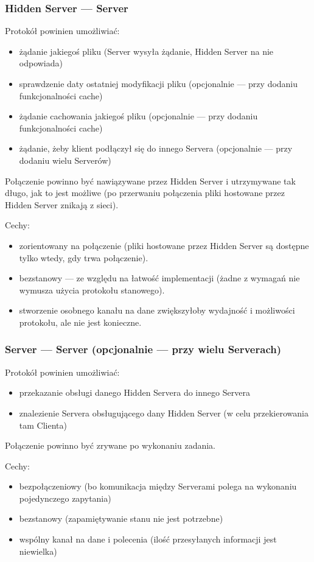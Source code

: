 \documentclass[a4paper,notitlepage]{article}
\begin{document}
\subsubsection{Hidden Server --- Server}
Protokół powinien umożliwiać:
\begin{itemize}
\item żądanie jakiegoś pliku (Server wysyła żądanie, Hidden Server na nie odpowiada)
\item sprawdzenie daty ostatniej modyfikacji pliku (opcjonalnie --- przy dodaniu funkcjonalności cache)
\item żądanie cachowania jakiegoś pliku (opcjonalnie --- przy dodaniu funkcjonalności cache)
\item żądanie, żeby klient podłączył się do innego Servera (opcjonalnie --- przy dodaniu wielu Serverów)
\end{itemize}
Połączenie powinno być nawiązywane przez Hidden Server i utrzymywane tak długo, jak to jest
możliwe (po przerwaniu połączenia pliki hostowane przez Hidden Server znikają z sieci).

\noindent Cechy:
\begin{itemize}
\item zorientowany na połączenie (pliki hostowane przez Hidden Server są dostępne tylko
wtedy, gdy trwa połączenie).
\item bezstanowy --- ze względu na łatwość implementacji (żadne z wymagań nie 
wymusza użycia protokołu stanowego).
\item stworzenie osobnego kanału na dane zwiększyłoby wydajność i możliwości protokołu,
ale nie jest konieczne.
\end{itemize}
\subsubsection{Server --- Server (opcjonalnie --- przy wielu Serverach)}
Protokół powinien umożliwiać:
\begin{itemize}
\item przekazanie obsługi danego Hidden Servera do innego Servera
\item znalezienie Servera obsługującego dany Hidden Server (w celu przekierowania tam Clienta)
\end{itemize}
Połączenie powinno być zrywane po wykonaniu zadania.

\noindent Cechy:
\begin{itemize}
\item bezpołączeniowy (bo komunikacja między Serverami polega na wykonaniu pojedynczego zapytania)
\item bezstanowy (zapamiętywanie stanu nie jest potrzebne)
\item wspólny kanał na dane i polecenia (ilość przesyłanych informacji jest niewielka)
\end{itemize}
\end{document}
